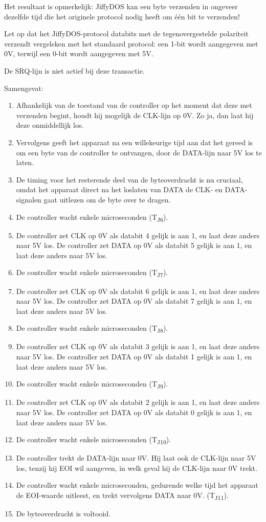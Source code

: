 Het resultaat is opmerkelijk: JiffyDOS{\texttrademark} kan een byte verzenden in ongeveer dezelfde tijd die het originele protocol nodig heeft om één bit te verzenden!

Let op dat het JiffyDOS{\texttrademark}-protocol databits met de tegenovergestelde polariteit verzendt vergeleken met het standaard protocol: een 1-bit wordt aangegeven met 0V, terwijl een 0-bit wordt aangegeven met 5V.

De SRQ-lijn is niet actief bij deze transactie.

Samengevat:

\begin{enumerate}
 \item Afhankelijk van de toestand van de controller op het moment dat deze met verzenden begint, houdt hij mogelijk de CLK-lijn op 0V. Zo ja, dan laat hij deze onmiddellijk los.\item Vervolgens geeft het apparaat na een willekeurige tijd aan dat het gereed is om een byte van de controller te ontvangen, door de DATA-lijn naar 5V los te laten.\item De timing voor het resterende deel van de byteoverdracht is nu cruciaal, omdat het apparaat direct na het loslaten van DATA de CLK- en DATA-signalen gaat uitlezen om de byte over te dragen.\item De controller wacht enkele microseconden  (T\textsubscript{J6}).\item De controller zet CLK op 0V als databit 4 gelijk is aan 1, en laat deze anders naar 5V los.  De controller zet DATA op 0V als databit 5 gelijk is aan 1, en laat deze anders naar 5V los.\item De controller wacht enkele microseconden  (T\textsubscript{J7}).\item De controller zet CLK op 0V als databit 6 gelijk is aan 1, en laat deze anders naar 5V los.  De controller zet DATA op 0V als databit 7 gelijk is aan 1, en laat deze anders naar 5V los.\item De controller wacht enkele microseconden  (T\textsubscript{J8}).\item De controller zet CLK op 0V als databit 3 gelijk is aan 1, en laat deze anders naar 5V los.  De controller zet DATA op 0V als databit 1 gelijk is aan 1, en laat deze anders naar 5V los.\item De controller wacht enkele microseconden  (T\textsubscript{J9}).\item De controller zet CLK op 0V als databit 2 gelijk is aan 1, en laat deze anders naar 5V los.  De controller zet DATA op 0V als databit 0 gelijk is aan 1, en laat deze anders naar 5V los.\item De controller wacht enkele microseconden  (T\textsubscript{J10}).\item De controller trekt de DATA-lijn naar 0V. Hij laat ook de  CLK-lijn naar 5V los, tenzij hij EOI wil aangeven, in welk  geval hij de CLK-lijn naar 0V trekt.\item De controller wacht enkele microseconden, gedurende welke tijd het  apparaat de EOI-waarde uitleest, en trekt vervolgens DATA naar 0V.  (T\textsubscript{J11}).\item De byteoverdracht is voltooid.
\end{enumerate}

